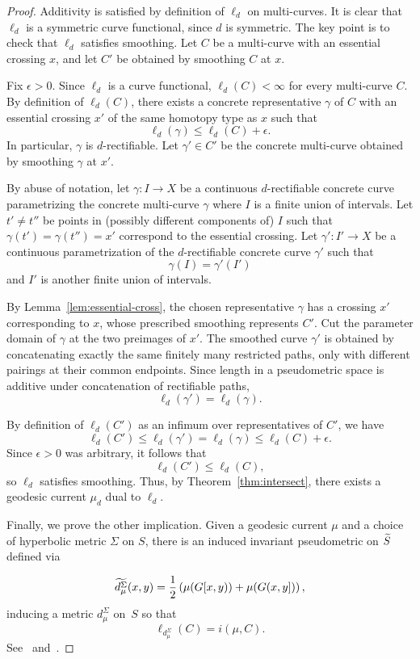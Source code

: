 \begin{proof}
Additivity is satisfied by definition of $\ell_d$ on multi-curves. It is clear that $\ell_d$ is a symmetric curve functional, since $d$ is symmetric.
The key point is to check that $\ell_d$ satisfies smoothing. 
Let $C$ be a multi-curve with an essential crossing $x$, and let $C'$ be obtained by smoothing $C$ at $x$.

Fix $\epsilon>0$. Since $\ell_d$ is a curve functional, $\ell_d(C)<\infty$ for every multi-curve $C$. By definition of $\ell_d(C)$, there exists a concrete representative $\gamma$ of $C$ with an essential crossing $x'$ of the same homotopy type as $x$ such that
\[
\ell_d(\gamma) \le \ell_d(C) + \epsilon.
\]
In particular, $\gamma$ is $d$-rectifiable.
Let $\gamma' \in C'$ be the concrete multi-curve obtained by smoothing $\gamma$ at $x'$.

By abuse of notation, let $\gamma \colon I \to X$ be a continuous $d$-rectifiable concrete curve parametrizing the concrete multi-curve $\gamma$ where $I$ is a finite union of intervals. Let $t' \neq t''$ be points in (possibly different components of) $I$ such that $\gamma(t') = \gamma(t'') = x'$ correspond to the essential crossing. Let $\gamma' \colon I' \to X$ be a continuous parametrization of the $d$-rectifiable concrete curve $\gamma'$ such that
\[
\gamma(I) = \gamma'(I')
\]
and $I'$ is another finite union of intervals.

By Lemma~\ref{lem:essential-cross}, the chosen representative $\gamma$ has a crossing
$x'$ corresponding to $x$, whose prescribed smoothing represents
$C'$. Cut the parameter domain of $\gamma$ at the two preimages of
$x'$. The smoothed curve $\gamma'$ is obtained by concatenating
exactly the same finitely many restricted paths, only with different
pairings at their common endpoints. Since length in a pseudometric
space is additive under concatenation of rectifiable paths,
\[
\ell_d(\gamma')=\ell_d(\gamma).
\]

By definition of $\ell_d(C')$ as an infimum over representatives of $C'$, we have
\[
\ell_d(C') \le \ell_d(\gamma') = \ell_d(\gamma) \le \ell_d(C) + \epsilon.
\]
Since $\epsilon>0$ was arbitrary, it follows that
\[
\ell_d(C') \le \ell_d(C),
\]
so $\ell_d$ satisfies smoothing.
Thus, by Theorem~\ref{thm:intersect}, there exists a geodesic current $\mu_d$ dual to $\ell_d$. 


Finally, we prove the other implication. Given a geodesic current $\mu$ and a choice of hyperbolic metric $\Sigma$ on $S$, there is an induced invariant pseudometric on $\widetilde{S}$ defined via

\begin{equation}\label{eq:d_mu}
\widetilde{d^\Sigma_\mu}(x,y) = \frac{1}{2}\left(\mu(G[x,y)) + \mu(G(x,y])\right),
\end{equation}
inducing a metric $d^\Sigma_\mu$ on~$S$
so that 
\[
\ell_{d^\Sigma_\mu}(C)=i(\mu, C).
\]
See~\cite[Section~4]{BIPP21:Systoles} and~\cite{dRMG22:Duals}.
\end{proof}

